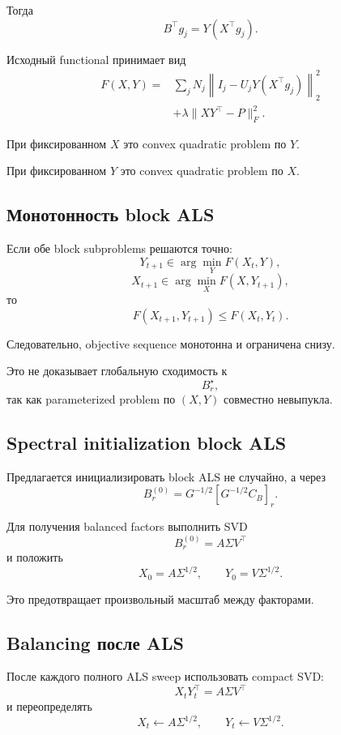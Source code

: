 Тогда
\[
    B^\top g_j
    =
    Y(X^\top g_j).
\]

Исходный functional принимает вид
\[
\boxed{
\begin{aligned}
    F(X,Y)
    ={}&
    \sum_j
    N_j
    \left\|
        I_j-U_jY(X^\top g_j)
    \right\|_2^2
    \\
    &+
    \lambda
    \|XY^\top-P\|_F^2.
\end{aligned}
}
\]

При фиксированном $X$ это convex quadratic problem по $Y$.

При фиксированном $Y$ это convex quadratic problem по $X$.

\subsection{Монотонность block ALS}

Если обе block subproblems решаются точно:
\[
    Y_{t+1}
    \in
    \arg\min_YF(X_t,Y),
\]
\[
    X_{t+1}
    \in
    \arg\min_XF(X,Y_{t+1}),
\]
то
\[
\boxed{
    F(X_{t+1},Y_{t+1})
    \le
    F(X_t,Y_t).
}
\]

Следовательно, objective sequence монотонна и ограничена снизу.

Это не доказывает глобальную сходимость к
\[
    B_r^\star,
\]
так как parameterized problem по $(X,Y)$ совместно невыпукла.

\subsection{Spectral initialization block ALS}

Предлагается инициализировать block ALS не случайно, а через
\[
\boxed{
    B_r^{(0)}
    =
    G^{-1/2}
    [G^{-1/2}C_B]_r.
}
\]

Для получения balanced factors выполнить SVD
\[
    B_r^{(0)}
    =
    A\Sigma V^\top
\]
и положить
\[
\boxed{
    X_0
    =
    A\Sigma^{1/2},
    \qquad
    Y_0
    =
    V\Sigma^{1/2}.
}
\]

Это предотвращает произвольный масштаб между факторами.

\subsection{Balancing после ALS}

После каждого полного ALS sweep использовать compact SVD:
\[
    X_tY_t^\top
    =
    A\Sigma V^\top
\]
и переопределять
\[
\boxed{
    X_t
    \leftarrow
    A\Sigma^{1/2},
    \qquad
    Y_t
    \leftarrow
    V\Sigma^{1/2}.
}
\]

